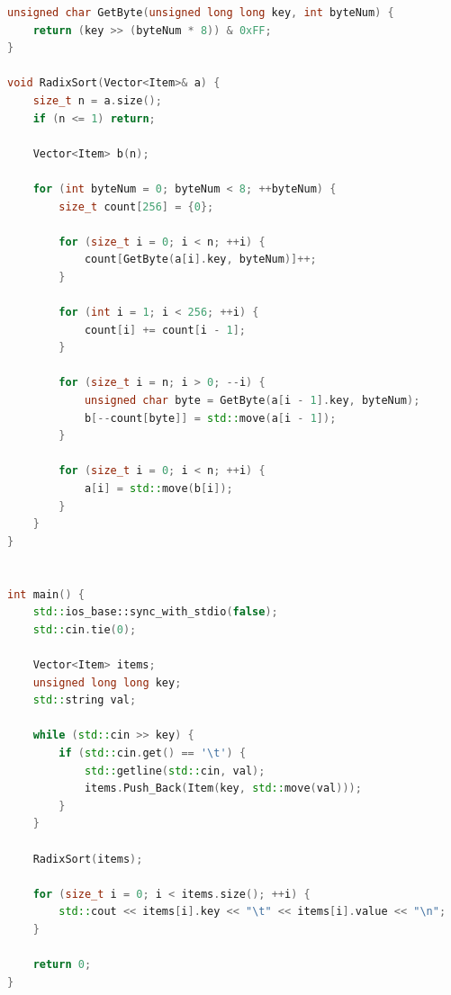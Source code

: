 \begin{lstlisting}[language=C++]
unsigned char GetByte(unsigned long long key, int byteNum) {
    return (key >> (byteNum * 8)) & 0xFF;
}

void RadixSort(Vector<Item>& a) {
    size_t n = a.size();
    if (n <= 1) return;

    Vector<Item> b(n);

    for (int byteNum = 0; byteNum < 8; ++byteNum) {
        size_t count[256] = {0};

        for (size_t i = 0; i < n; ++i) {
            count[GetByte(a[i].key, byteNum)]++;
        }

        for (int i = 1; i < 256; ++i) {
            count[i] += count[i - 1];
        }

        for (size_t i = n; i > 0; --i) {
            unsigned char byte = GetByte(a[i - 1].key, byteNum);
            b[--count[byte]] = std::move(a[i - 1]);
        }

        for (size_t i = 0; i < n; ++i) {
            a[i] = std::move(b[i]);
        }
    }
}


int main() {
    std::ios_base::sync_with_stdio(false);
    std::cin.tie(0);

    Vector<Item> items;
    unsigned long long key;
    std::string val;

    while (std::cin >> key) {
        if (std::cin.get() == '\t') {
            std::getline(std::cin, val);
            items.Push_Back(Item(key, std::move(val)));
        }
    }

    RadixSort(items);

    for (size_t i = 0; i < items.size(); ++i) {
        std::cout << items[i].key << "\t" << items[i].value << "\n";
    }

    return 0;
}
\end{lstlisting}
\pagebreak